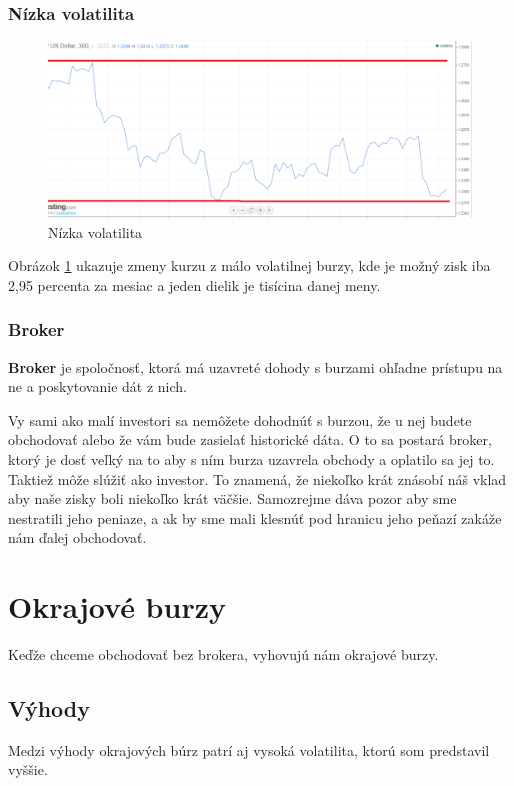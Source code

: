 \subsubsection{Nízka volatilita}  
\begin{figure}[!hbt] 
\begin{center} 
\includegraphics[width=1\textwidth]{obr2} 
\caption{Nízka volatilita} 
\label{img:nvolat} 
\end{center} 
\end{figure} 

\begin{myex}
Obrázok \ref{img:nvolat} ukazuje zmeny kurzu z málo volatilnej burzy, kde je  možný zisk iba 2,95 percenta za mesiac a jeden dielik je tisícina danej meny.   
\end{myex} 


\subsubsection{Broker} 
\begin{mydef} 
{\bf Broker}\cite{ZAC} je spoločnosť, ktorá má uzavreté dohody s burzami ohľadne prístupu na ne a poskytovanie dát z nich.
\end{mydef} 
Vy sami ako malí investori sa nemôžete dohodnúť s burzou, že u nej budete obchodovať alebo že vám bude zasielať historické dáta. O to sa postará broker, ktorý je dosť veľký na to aby s ním burza uzavrela obchody a oplatilo sa jej to. Taktiež môže slúžiť ako investor. To znamená, že niekoľko krát znásobí náš vklad aby naše zisky boli niekoľko krát väčšie. Samozrejme dáva pozor aby sme nestratili jeho peniaze, a ak by sme mali klesnúť pod hranicu jeho peňazí zakáže nám ďalej obchodovať.  
\section{Okrajové burzy} 
Keďže chceme obchodovať bez brokera, vyhovujú nám okrajové burzy. 
\subsection{Výhody} 
Medzi výhody okrajových búrz patrí aj vysoká volatilita, ktorú som predstavil vyššie. 
